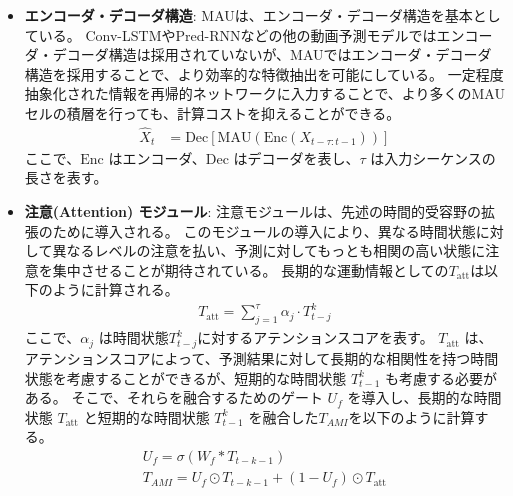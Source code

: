       \begin{itemize}

        \item \textbf{エンコーダ・デコーダ構造}: MAUは、エンコーダ・デコーダ構造を基本としている。
        Conv-LSTMやPred-RNNなどの他の動画予測モデルではエンコーダ・デコーダ構造は採用されていないが、MAUではエンコーダ・デコーダ構造を採用することで、より効率的な特徴抽出を可能にしている。
        一定程度抽象化された情報を再帰的ネットワークに入力することで、より多くのMAUセルの積層を行っても、計算コストを抑えることができる。
        \begin{align}
          \hat{X}_t &= \text{Dec}[\text{MAU}(\text{Enc}(X_{t-\tau:t-1}))]
        \end{align}
        ここで、\( \text{Enc} \) はエンコーダ、\( \text{Dec} \) はデコーダを表し、\( \tau \) は入力シーケンスの長さを表す。
          
        \item \textbf{注意(Attention) モジュール}: 
        注意モジュールは、先述の時間的受容野の拡張のために導入される。
        このモジュールの導入により、異なる時間状態に対して異なるレベルの注意を払い、予測に対してもっとも相関の高い状態に注意を集中させることが期待されている。
        長期的な運動情報としての\( T_{\text{att}} \)は以下のように計算される。
        \begin{align}
          T_{\text{att}} = \sum_{j=1}^{\tau} \alpha_j \cdot T_{t-j}^{k}
        \end{align}
        ここで、\( \alpha_j \) は時間状態\( T_{t-j}^{k} \)に対するアテンションスコアを表す。
        \( T_{\text{att}} \) は、アテンションスコアによって、予測結果に対して長期的な相関性を持つ時間状態を考慮することができるが、短期的な時間状態 \( T_{t-1}^{k} \) も考慮する必要がある。
        そこで、それらを融合するためのゲート \( U_f \) を導入し、長期的な時間状態 \( T_{\text{att}} \) と短期的な時間状態 \( T_{t-1}^{k} \) を融合した\( T_{AMI} \)を以下のように計算する。
        \begin{align}
          U_f = \sigma(W_f \ast T_{t-k-1}) \\
          T_{AMI} = U_f \odot T_{t-k-1} + (1 - U_f) \odot T_{\text{att}} 
        \end{align}


\end{itemize}
